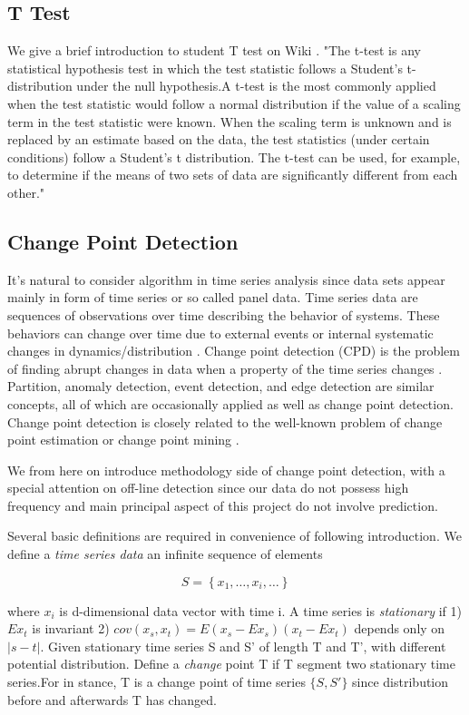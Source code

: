 \documentclass{article}
\begin{document}
\subsection{T Test}
\label{test}

We give a brief introduction to student T test on Wiki \cite{Ttest}.
"The t-test is any statistical hypothesis test in which the test statistic follows a Student's t-distribution under the null hypothesis.A t-test is the most commonly applied when the test statistic would follow a normal distribution if the value of a scaling term in the test statistic were known. When the scaling term is unknown and is replaced by an estimate based on the data, the test statistics (under certain conditions) follow a Student's t distribution. The t-test can be used, for example, to determine if the means of two sets of data are significantly different from each other."
\subsection{Change Point Detection}
\label{change}
It's natural to consider algorithm in time series analysis since data sets appear mainly in form of time series or so called panel data. Time series data are sequences of observations over time describing the behavior of systems. These behaviors can change over time due to external events or internal systematic changes in dynamics/distribution . Change point detection (CPD) is the problem of finding abrupt changes in data when a property of the time series changes \cite{CPD1}. 
Partition, anomaly detection, event detection, and edge detection are similar concepts, all of which are occasionally applied as well as change point detection. Change point detection is closely related to the well-known problem of change point estimation or change point mining \cite{CPD2}. 

We from here on introduce methodology side of change point detection, with a special attention on off-line detection since our data do not possess high frequency and main principal aspect of this project do not involve prediction.

Several basic definitions are required in convenience of following introduction. We define a \textit{time series data} an infinite sequence of elements 

\begin{equation}
S=\left\{x_{1}, \ldots, x_{i}, \ldots\right\}
\end{equation}

where $x_i$ is d-dimensional data vector with time i. A time series is \textit{stationary} if 1) $E x_t$ is invariant 2) $cov(x_s,x_t)=E (x_s-E x_s) (x_t-E x_t)$ depends only on $|s-t|$. Given stationary time series S and S' of length T and T', with different potential distribution. Define a \textit{change} point T if T segment two stationary time series.For in stance, T is a change point of time series $\{S,S'\}$ since distribution before and afterwards T has changed. 
\end{document}

